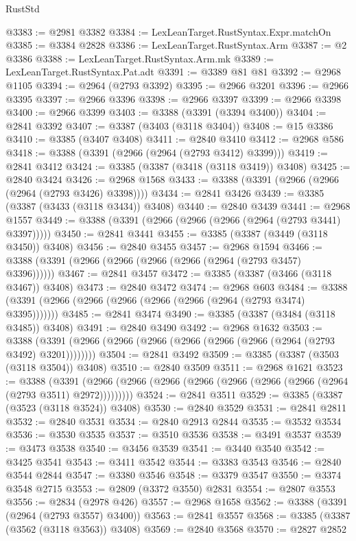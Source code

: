 \begin{lexlean}{RustStd}
\begin{coremodule}
{\begin{coremodule}
{{{{{{{{{{{{{{{{{{{{{{{{{{{{{{{{{@3383 := @2981 @3382
@3384 := LexLeanTarget.RustSyntax.Expr.matchOn
@3385 := @3384 @2828
@3386 := LexLeanTarget.RustSyntax.Arm
@3387 := @2 @3386
@3388 := LexLeanTarget.RustSyntax.Arm.mk
@3389 := LexLeanTarget.RustSyntax.Pat.adt
@3391 := @3389 @81 @81
@3392 := @2968 @1105
@3394 := @2964 (@2793 @3392)
@3395 := @2966 @3201
@3396 := @2966 @3395
@3397 := @2966 @3396
@3398 := @2966 @3397
@3399 := @2966 @3398
@3400 := @2966 @3399
@3403 := @3388 (@3391 (@3394 @3400))
@3404 := @2841 @3392
@3407 := @3387 (@3403 (@3118 @3404))
@3408 := @15 @3386
@3410 := @3385 (@3407 @3408)
@3411 := @2840 @3410
@3412 := @2968 @586
@3418 := @3388 (@3391 (@2966 (@2964 (@2793 @3412) @3399)))
@3419 := @2841 @3412
@3424 := @3385 (@3387 (@3418 (@3118 @3419)) @3408)
@3425 := @2840 @3424
@3426 := @2968 @1568
@3433 := @3388 (@3391 (@2966 (@2966 (@2964 (@2793 @3426) @3398))))
@3434 := @2841 @3426
@3439 := @3385 (@3387 (@3433 (@3118 @3434)) @3408)
@3440 := @2840 @3439
@3441 := @2968 @1557
@3449 := @3388 (@3391 (@2966 (@2966 (@2966 (@2964 (@2793 @3441) @3397)))))
@3450 := @2841 @3441
@3455 := @3385 (@3387 (@3449 (@3118 @3450)) @3408)
@3456 := @2840 @3455
@3457 := @2968 @1594
@3466 := @3388 (@3391 (@2966 (@2966 (@2966 (@2966 (@2964 (@2793 @3457) @3396))))))
@3467 := @2841 @3457
@3472 := @3385 (@3387 (@3466 (@3118 @3467)) @3408)
@3473 := @2840 @3472
@3474 := @2968 @603
@3484 := @3388 (@3391 (@2966 (@2966 (@2966 (@2966 (@2966 (@2964 (@2793 @3474) @3395)))))))
@3485 := @2841 @3474
@3490 := @3385 (@3387 (@3484 (@3118 @3485)) @3408)
@3491 := @2840 @3490
@3492 := @2968 @1632
@3503 := @3388 (@3391 (@2966 (@2966 (@2966 (@2966 (@2966 (@2966 (@2964 (@2793 @3492) @3201))))))))
@3504 := @2841 @3492
@3509 := @3385 (@3387 (@3503 (@3118 @3504)) @3408)
@3510 := @2840 @3509
@3511 := @2968 @1621
@3523 := @3388
    (@3391 (@2966 (@2966 (@2966 (@2966 (@2966 (@2966 (@2966 (@2964 (@2793 @3511) @2972)))))))))
@3524 := @2841 @3511
@3529 := @3385 (@3387 (@3523 (@3118 @3524)) @3408)
@3530 := @2840 @3529
@3531 := @2841 @2811
@3532 := @2840 @3531
@3534 := @2840 @2913 @2844
@3535 := @3532 @3534
@3536 := @3530 @3535
@3537 := @3510 @3536
@3538 := @3491 @3537
@3539 := @3473 @3538
@3540 := @3456 @3539
@3541 := @3440 @3540
@3542 := @3425 @3541
@3543 := @3411 @3542
@3544 := @3383 @3543
@3546 := @2840 @3544 @2844
@3547 := @3380 @3546
@3548 := @3379 @3547
@3550 := @3374 @3548 @2715
@3553 := @2809 (@3372 @3550) @2831
@3554 := @2807 @3553
@3556 := @2834 (@2978 @426)
@3557 := @2968 @1658
@3562 := @3388 (@3391 (@2964 (@2793 @3557) @3400))
@3563 := @2841 @3557
@3568 := @3385 (@3387 (@3562 (@3118 @3563)) @3408)
@3569 := @2840 @3568
@3570 := @2827 @2852
}}}}}}}}}}}}}}}}}}}}}}}}}}}}}}}}}
\end{coremodule}}
\end{coremodule}
\end{lexlean}
